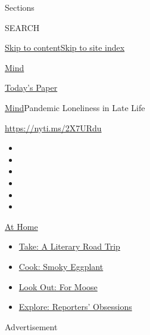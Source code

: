 Sections

SEARCH

\protect\hyperlink{site-content}{Skip to
content}\protect\hyperlink{site-index}{Skip to site index}

\href{https://www.nytimes.com/section/well/mind}{Mind}

\href{https://myaccount.nytimes.com/auth/login?response_type=cookie\&client_id=vi}{}

\href{https://www.nytimes.com/section/todayspaper}{Today's Paper}

\href{/section/well/mind}{Mind}\textbar{}Pandemic Loneliness in Late
Life

\url{https://nyti.ms/2X7URdu}

\begin{itemize}
\item
\item
\item
\item
\item
\item
\end{itemize}

\href{https://www.nytimes.com/spotlight/at-home?action=click\&pgtype=Article\&state=default\&region=TOP_BANNER\&context=at_home_menu}{At
Home}

\begin{itemize}
\tightlist
\item
  \href{https://www.nytimes.com/2020/07/28/books/time-for-a-literary-road-trip.html?action=click\&pgtype=Article\&state=default\&region=TOP_BANNER\&context=at_home_menu}{Take:
  A Literary Road Trip}
\item
  \href{https://www.nytimes.com/2020/07/29/magazine/bored-with-your-home-cooking-some-smoky-eggplant-will-fix-that.html?action=click\&pgtype=Article\&state=default\&region=TOP_BANNER\&context=at_home_menu}{Cook:
  Smoky Eggplant}
\item
  \href{https://www.nytimes.com/2020/07/27/travel/moose-michigan-isle-royale.html?action=click\&pgtype=Article\&state=default\&region=TOP_BANNER\&context=at_home_menu}{Look
  Out: For Moose}
\item
  \href{https://www.nytimes.com/interactive/2020/at-home/even-more-reporters-editors-diaries-lists-recommendations.html?action=click\&pgtype=Article\&state=default\&region=TOP_BANNER\&context=at_home_menu}{Explore:
  Reporters' Obsessions}
\end{itemize}

Advertisement

